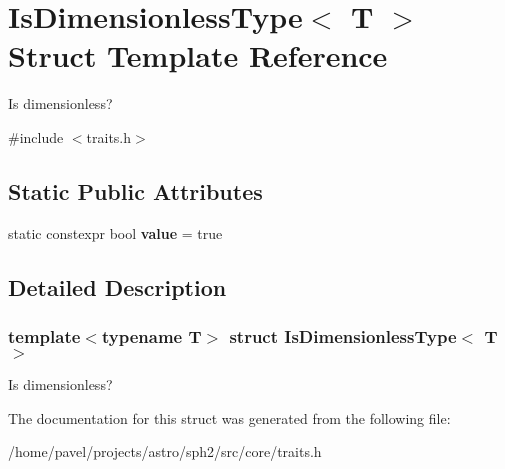 \hypertarget{structIsDimensionlessType}{}\section{Is\+Dimensionless\+Type$<$ T $>$ Struct Template Reference}
\label{structIsDimensionlessType}


Is dimensionless?  




{\ttfamily \#include $<$traits.\+h$>$}

\subsection*{Static Public Attributes}
\begin{DoxyCompactItemize}
\item 
\hypertarget{structIsDimensionlessType_acf7d71c6c1406613b76e9622bbdb3016}{}\label{structIsDimensionlessType_acf7d71c6c1406613b76e9622bbdb3016} 
static constexpr bool {\bfseries value} = true
\end{DoxyCompactItemize}


\subsection{Detailed Description}
\subsubsection*{template$<$typename T$>$\newline
struct Is\+Dimensionless\+Type$<$ T $>$}

Is dimensionless? 

The documentation for this struct was generated from the following file\+:\begin{DoxyCompactItemize}
\item 
/home/pavel/projects/astro/sph2/src/core/traits.\+h\end{DoxyCompactItemize}
